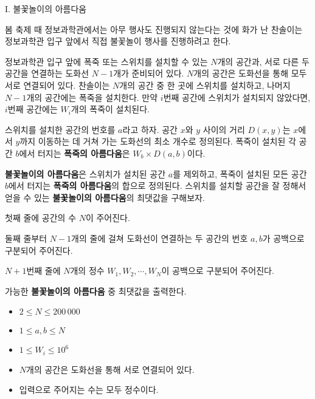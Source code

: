 \def\probtitle{불꽃놀이의 아름다움}
\def\probno{I} %

\begin{problem}{\probno{}. \probtitle{}}

봄 축제 때 정보과학관에서는 아무 행사도 진행되지 않는다는 것에 화가 난 찬솔이는 정보과학관 입구 앞에서 직접 불꽃놀이 행사를 진행하려고 한다.

정보과학관 입구 앞에 폭죽 또는 스위치를 설치할 수 있는 $N$개의 공간과, 서로 다른 두 공간을 연결하는 도화선 $N-1$개가 준비되어 있다. $N$개의 공간은 도화선을 통해 모두 서로 연결되어 있다. 찬솔이는 $N$개의 공간 중 한 곳에 스위치를 설치하고, 나머지 $N-1$개의 공간에는 폭죽을 설치한다. 만약 $i$번째 공간에 스위치가 설치되지 않았다면, $i$번째 공간에는 $W_i$개의 폭죽이 설치된다.

스위치를 설치한 공간의 번호를 $a$라고 하자. 공간 $x$와 $y$ 사이의 거리 $D(x, y)$는 $x$에서 $y$까지 이동하는 데 거쳐 가는 도화선의 최소 개수로 정의된다. 폭죽이 설치된 각 공간 $b$에서 터지는 \textbf{폭죽의 아름다움}은 $W_b \times D(a,b)$이다.

\textbf{불꽃놀이의 아름다움}은 스위치가 설치된 공간 $a$를 제외하고, 폭죽이 설치된 모든 공간 $b$에서 터지는 \textbf{폭죽의 아름다움}의 합으로 정의된다. 스위치를 설치할 공간을 잘 정해서 얻을 수 있는 \textbf{불꽃놀이의 아름다움}의 최댓값을 구해보자.

\InputFile

첫째 줄에 공간의 수 $N$이 주어진다.

둘째 줄부터 $N-1$개의 줄에 걸쳐 도화선이 연결하는 두 공간의 번호 $a,b$가 공백으로 구분되어 주어진다.

$N+1$번째 줄에 $N$개의 정수 $W_1, W_2, \cdots, W_N$이 공백으로 구분되어 주어진다.

\OutputFile

가능한 \textbf{불꽃놀이의 아름다움} 중 최댓값을 출력한다.

\Constraints

\begin{itemize}[topsep=0pt,noitemsep]
    \item $2\leq N\leq 200\,000$
    \item $1 \leq a, b \leq N$
    \item $1\leq W_i \leq 10^6$
    \item $N$개의 공간은 도화선을 통해 서로 연결되어 있다.
    \item 입력으로 주어지는 수는 모두 정수이다.
\end{itemize}

\pagebreak


\end{problem}
